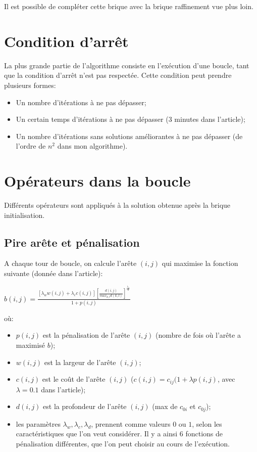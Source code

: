 \documentclass[a4paper,11pt]{article}%
\begin{document}
Il est possible de compléter cette brique avec la brique raffinement vue plus loin.
\section*{Condition d'arrêt}

La plus grande partie de l'algorithme consiste en l'exécution d'une boucle, tant que la condition d'arrêt n'est pas respectée. Cette condition peut prendre plusieurs formes:
\begin{itemize}
\item Un nombre d'itérations à ne pas dépasser;
\item Un certain temps d'itérations à ne pas dépasser (3 minutes dans l'article);
\item Un nombre d'itérations sans solutions améliorantes à ne pas dépasser (de l'ordre de $n^2$ dans mon algorithme). 
\end{itemize}

\section*{Opérateurs dans la boucle}

Différents opérateurs sont appliqués à la solution obtenue après la brique initialisation.

\subsection*{Pire arête et pénalisation}
A chaque tour de boucle, on calcule l'arête $(i,j)$ qui maximise la fonction suivante (donnée dans l'article):
\begin{center}
$b(i,j) = \frac{[\lambda_w w(i,j) + \lambda_c c(i,j)] [\frac{d(i,j)}{max_{k,l}d(k,l)}] ^ {\frac{\lambda_d}{2}}}{1+p(i,j)}$
\end{center}
où:
\begin{itemize}
\item $p(i,j)$ est la pénalisation de l'arête $(i,j)$ (nombre de fois où l'arête a maximisé $b$);
\item $w(i,j)$ est la largeur de l'arête $(i,j)$;
\item $c(i,j)$ est le coût de l'arête $(i,j)$ ($c(i,j) = c_{ij}(1 + \lambda p(i,j)$, avec $\lambda = 0.1$ dans l'article);
\item $d(i,j)$ est la profondeur de l'arête $(i,j)$ (max de $c_{0i}$ et $c_{0j}$);
\item les paramètres $\lambda_w,\lambda_c,\lambda_d$, prennent comme valeurs $0$ ou $1$, selon les caractéristiques que l'on veut considérer. Il y a ainsi 6 fonctions de pénalisation différentes, que l'on peut choisir au cours de l'exécution.

\end{itemize}
\end{document}
